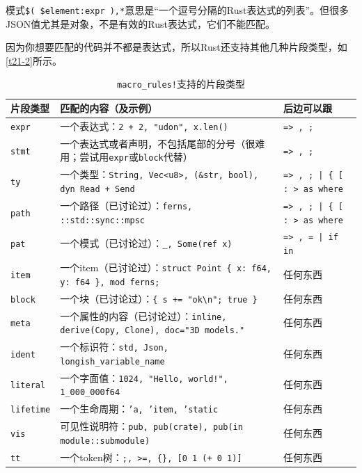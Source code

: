 模式\texttt{\$( \$element:expr ),*}意思是“一个逗号分隔的Rust表达式的列表”。但很多JSON值尤其是对象，不是有效的Rust表达式，它们不能匹配。

因为你想要匹配的代码并不都是表达式，所以Rust还支持其他几种片段类型，如\autoref{t21-2}所示。

\begin{table}[htbp]
    \centering
    \caption{\texttt{macro\_rules!}支持的片段类型}
    \label{t21-2}
    \begin{tabular}{lp{}p{}}
        \hline
        \textbf{片段类型}   & \textbf{匹配的内容（及示例）} &   \textbf{后边可以跟} \\
        \hline
        \texttt{expr}   & 一个表达式：\texttt{2 + 2, "udon", x.len()}   & \texttt{=> , ;}   \\
        \rowcolor{tablecolor}
        \texttt{stmt}   & 一个表达式或者声明，不包括尾部的分号（很难用；尝试用\texttt{expr}或\texttt{block}代替）   & \texttt{=> , ;} \\
        \texttt{ty} & 一个类型：\texttt{String, Vec<u8>, (\&str, bool), dyn Read + Send}    & \texttt{=> , ; | \{ [ : > as where} \\
        \rowcolor{tablecolor}
        \texttt{path}   & 一个路径（已讨论过）：\texttt{ferns, ::std::sync::mpsc}   & \texttt{=> , ; | \{ [ : > as where} \\
        \texttt{pat}    & 一个模式（已讨论过）：\texttt{\_, Some(ref x)}    & \texttt{=> , = | if in} \\
        \rowcolor{tablecolor}
        \texttt{item}   & 一个item（已讨论过）：\texttt{struct Point \{ x: f64, y: f64 \}, mod ferns;}  & 任何东西 \\
        \texttt{block}  & 一个块（已讨论过）：\texttt{\{ s += "ok\textbackslash n"; true \}}  & 任何东西  \\
        \rowcolor{tablecolor}
        \texttt{meta}   & 一个属性的内容（已讨论过）：\texttt{inline, derive(Copy, Clone), doc="3D models."} & 任何东西 \\
        \texttt{ident}  & 一个标识符：\texttt{std, Json, longish\_variable\_name}   & 任何东西 \\
        \rowcolor{tablecolor}
        \texttt{literal}& 一个字面值：\texttt{1024, "Hello, world!", 1\_000\_000f64}    & 任何东西 \\
        \texttt{lifetime} & 一个生命周期：\texttt{'a, 'item, 'static}   & 任何东西 \\
        \rowcolor{tablecolor}
        \texttt{vis}    & 可见性说明符：\texttt{pub, pub(crate), pub(in module::submodule)} & 任何东西 \\
        \texttt{tt}     & 一个token树：\texttt{;, >=, \{\}, [0 1 (+ 0 1)]}  & 任何东西 \\
    \end{tabular}
\end{table}

